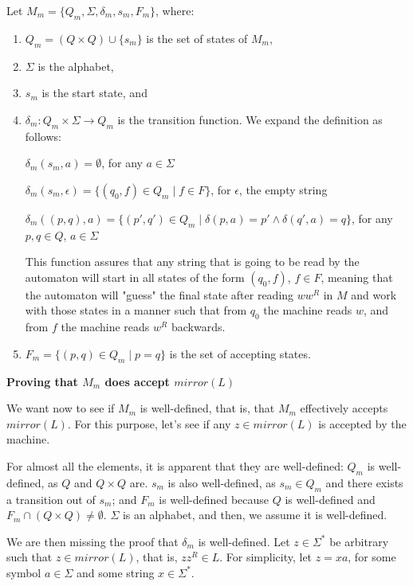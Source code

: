 \documentclass[12pt]{article}
\begin{document}
Let $M_m = \{Q_m, \Sigma, \delta_m, s_m, F_m\}$, where:
\begin{enumerate}
    \item $Q_m = (Q \times Q) \cup \{s_m\}$ is the set of states of $M_m$,
    \item $\Sigma$ is the alphabet,
    \item $s_m$ is the start state, and
    \item $\delta_m : Q_m \times \Sigma \rightarrow Q_m$ is the transition function. We expand the definition as follows:
    
    $\delta_m (s_m, a) = \emptyset$, for any $a \in \Sigma$
    
    $\delta_m (s_m, \epsilon) = \{(q_0, f) \in Q_m \mid f \in F\}$, for $\epsilon$, the empty string
    
    $\delta_m ((p, q), a) = \{(p', q') \in Q_m \mid \delta(p, a) = p' \land \delta(q', a) = q\}$, for any $p, q \in Q$, $a \in \Sigma$

    This function assures that any string that is going to be read by the automaton will start in all states of the form $(q_0, f)$, $f \in F$, meaning that the automaton will "guess" the final state after reading $ww^R$ in $M$ and work with those states in a manner such that from $q_0$ the machine reads $w$, and from $f$ the machine reads $w^R$ backwards.
    
    \item $F_m = \{(p, q) \in Q_m \mid p = q\}$ is the set of accepting states.
\end{enumerate}

\textbf{Proving that $M_m$ does accept $mirror(L)$}

We want now to see if $M_m$ is well-defined, that is, that $M_m$ effectively accepts $mirror(L)$. For this purpose, let's see if any $z \in mirror(L)$ is accepted by the machine.

For almost all the elements, it is apparent that they are well-defined: $Q_m$ is well-defined, as $Q$ and $Q \times Q$ are. $s_m$ is also well-defined, as $s_m \in Q_m$ and there exists a transition out of $s_m$; and $F_m$ is well-defined because $Q$ is well-defined and $F_m \cap (Q \times Q) \neq \emptyset$. $\Sigma$ is an alphabet, and then, we assume it is well-defined.

We are then missing the proof that $\delta_m$ is well-defined. Let $z \in \Sigma^*$ be arbitrary such that $z \in mirror(L)$, that is, $zz^R \in L$. For simplicity, let $z = xa$, for some symbol $a \in \Sigma$ and some string $x \in \Sigma^*$.
\end{document}
